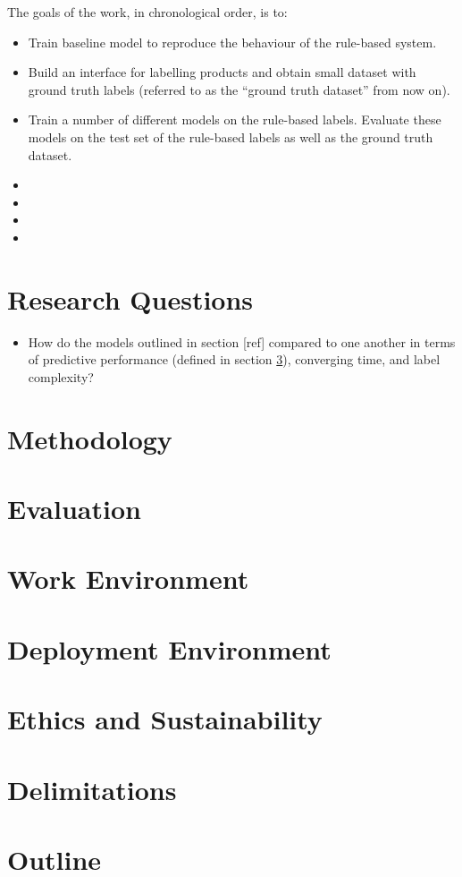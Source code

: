 The goals of the work, in chronological order, is to:

\begin{itemize}
  \item Train  baseline model to reproduce the behaviour of the rule-based system.
  \item Build an interface for labelling products and obtain small dataset with ground truth labels (referred to as the ``ground truth dataset'' from now on).
  \item Train a number of different models on the rule-based labels.  Evaluate these models on the test set of the rule-based  labels as well as the ground truth dataset.
  \item
  \item
  \item
  \item
\end{itemize}

\section{Research Questions}

\begin{itemize}
  \item How do the models  outlined in section [ref] compared to one another in terms of predictive performance (defined in section \ref{evaluation}), converging time, and  label complexity?
\end{itemize}

\section{Methodology}
\section{Evaluation}
\label{evaluation}
\section{Work Environment}
\section{Deployment Environment}
\section{Ethics and Sustainability}
\section{Delimitations}
\section{Outline}
